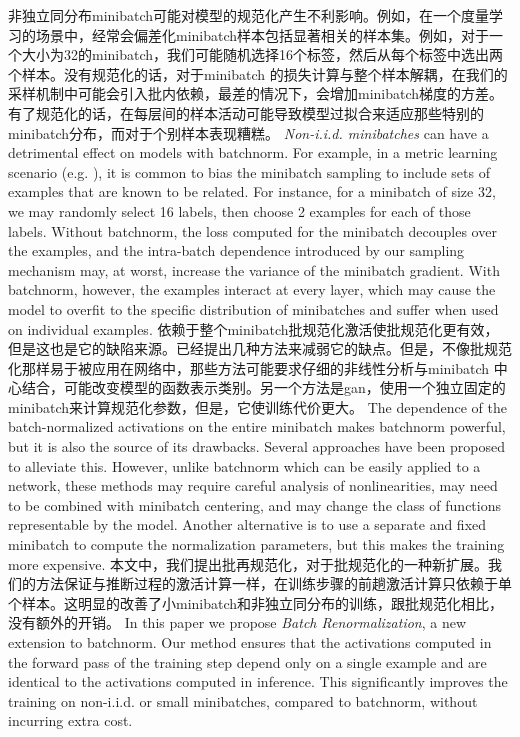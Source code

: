 非独立同分布minibatch可能对模型的规范化产生不利影响。例如，在一个度量学习的场景中，经常会偏差化minibatch样本包括显著相关的样本集。例如，对于一个大小为32的minibatch，我们可能随机选择16个标签，然后从每个标签中选出两个样本。没有规范化的话，对于minibatch 的损失计算与整个样本解耦，在我们的采样机制中可能会引入批内依赖，最差的情况下，会增加minibatch梯度的方差。有了规范化的话，在每层间的样本活动可能导致模型过拟合来适应那些特别的minibatch分布，而对于个别样本表现糟糕。
{\em Non-i.i.d. minibatches} can have a detrimental effect on models with batchnorm. For example, in a metric learning scenario (e.g. \cite{nca}), it is common to bias the minibatch sampling to include sets of examples that are known to be related. For instance, for a minibatch of size 32, we may randomly select 16 labels, then choose 2 examples for each of those labels. Without batchnorm, the loss computed for the minibatch decouples over the examples, and the intra-batch dependence introduced by our sampling mechanism may, at worst, increase the variance of the minibatch gradient. With batchnorm, however, the examples interact at every layer, which may cause the model to overfit to the specific distribution of minibatches and suffer when used on individual examples.
依赖于整个minibatch批规范化激活使批规范化更有效，但是这也是它的缺陷来源。已经提出几种方法来减弱它的缺点。但是，不像批规范化那样易于被应用在网络中，那些方法可能要求仔细的非线性分析与minibatch 中心结合，可能改变模型的函数表示类别。另一个方法是gan，使用一个独立固定的minibatch来计算规范化参数，但是，它使训练代价更大。
The dependence of the batch-normalized activations on the entire minibatch makes batchnorm powerful, but it is also the source of its drawbacks. Several approaches \cite{weightnorm,layernorm,normprop} have been proposed to alleviate this. However, unlike batchnorm which can be easily applied to a network, these methods may require careful analysis of nonlinearities, may need to be combined with  minibatch centering, and may change the class of functions representable by the model. Another alternative \cite{gan} is to use a separate and fixed minibatch to compute the normalization parameters, but this makes the training more expensive.
本文中，我们提出批再规范化，对于批规范化的一种新扩展。我们的方法保证与推断过程的激活计算一样，在训练步骤的前趟激活计算只依赖于单个样本。这明显的改善了小minibatch和非独立同分布的训练，跟批规范化相比，没有额外的开销。
In this paper we propose {\em Batch Renormalization}, a new extension to batchnorm. Our method ensures that the activations computed in the forward pass of the training step depend only on a single example and are identical to the activations computed in inference. This significantly improves the training on non-i.i.d. or small minibatches, compared to batchnorm, without incurring extra cost.

